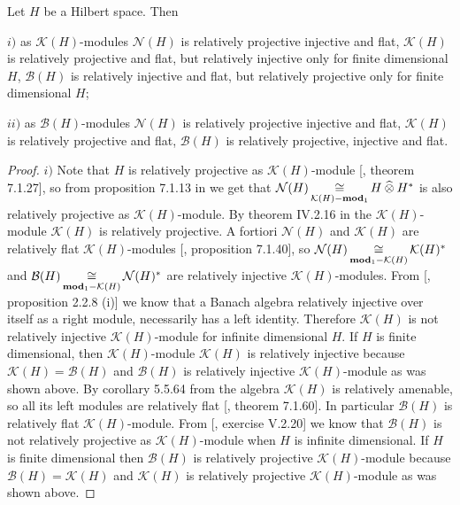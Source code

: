 \begin{proposition}\label{KHAndBHModsRelTh} Let $H$ be a Hilbert space. Then

$i)$ as $\mathcal{K}(H)$-modules $\mathcal{N}(H)$ is relatively projective injective and flat, $\mathcal{K}(H)$ is relatively projective and flat, but relatively injective only for finite dimensional $H$, $\mathcal{B}(H)$ is relatively injective and flat, but relatively projective only for finite dimensional $H$;

$ii)$ as $\mathcal{B}(H)$-modules $\mathcal{N}(H)$ is relatively projective injective and flat, $\mathcal{K}(H)$ is relatively projective and flat, $\mathcal{B}(H)$ is relatively projective, injective and flat.

\end{proposition}
\begin{proof} $i)$ Note that $H$ is relatively projective as $\mathcal{K}(H)$-module [\cite{HelBanLocConvAlg}, theorem 7.1.27], so from proposition 7.1.13 in \cite{HelBanLocConvAlg} we get that $\mathcal{N}(H)\mathop{\mathbin{\cong}}\limits_{\mathcal{K}(H)-\mathbf{mod}_1}H\mathbin{\widehat{\otimes}} H^*$ is also relatively projective as $\mathcal{K}(H)$-module. By theorem IV.2.16 in \cite{HelHomolBanTopAlg} the $\mathcal{K}(H)$-module $\mathcal{K}(H)$ is relatively projective. A fortiori $\mathcal{N}(H)$ and $\mathcal{K}(H)$ are relatively flat $\mathcal{K}(H)$-modules [\cite{HelBanLocConvAlg}, proposition 7.1.40], so $\mathcal{N}(H)\mathop{\mathbin{\cong}}\limits_{\mathbf{mod}_1-\mathcal{K}(H)}\mathcal{K}(H)^*$ and  $\mathcal{B}(H)\mathop{\mathbin{\cong}}\limits_{\mathbf{mod}_1-\mathcal{K}(H)}\mathcal{N}(H)^*$ are relatively injective $\mathcal{K}(H)$-modules. From [\cite{RamsHomPropSemgroupAlg}, proposition 2.2.8  (i)] we know that a Banach algebra relatively injective over itself as a right module, necessarily has a left identity. Therefore $\mathcal{K}(H)$ is not relatively injective $\mathcal{K}(H)$-module for infinite dimensional $H$. If $H$ is finite dimensional, then $\mathcal{K}(H)$-module $\mathcal{K}(H)$ is relatively injective because $\mathcal{K}(H)=\mathcal{B}(H)$ and $\mathcal{B}(H)$ is relatively injective $\mathcal{K}(H)$-module as was shown above. By corollary 5.5.64 from \cite{DalBanAlgAutCont} the algebra $\mathcal{K}(H)$ is relatively amenable, so all its left modules are relatively flat [\cite{HelBanLocConvAlg}, theorem 7.1.60]. In particular $\mathcal{B}(H)$ is relatively flat $\mathcal{K}(H)$-module. From [\cite{HelHomolBanTopAlg}, exercise V.2.20] we know that $\mathcal{B}(H)$ is not relatively projective as $\mathcal{K}(H)$-module when $H$ is infinite dimensional. If $H$ is finite dimensional then $\mathcal{B}(H)$ is relatively projective $\mathcal{K}(H)$-module because $\mathcal{B}(H)=\mathcal{K}(H)$ and $\mathcal{K}(H)$ is relatively projective $\mathcal{K}(H)$-module as was shown above.


\end{proof}

